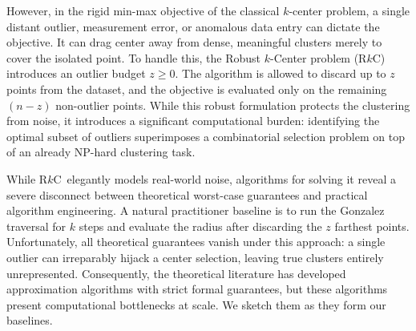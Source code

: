 \documentclass[twoside,leqno,twocolumn]{article}
\newcommand{\rkc}{R$k$C}
\begin{document}
However, in the rigid min-max objective of the classical $k$-center problem, a single distant outlier, measurement error, or anomalous data entry can dictate the objective. It can drag center away from dense, meaningful clusters merely to cover the isolated point. To handle this, the Robust $k$-Center problem (\rkc) introduces an outlier budget $z \ge 0$. The algorithm is allowed to discard up to $z$ points from the dataset, and the objective is evaluated only on the remaining $(n - z)$ non-outlier points. While this robust formulation protects the clustering from noise, it introduces a significant computational burden: identifying the optimal subset of outliers superimposes a combinatorial selection problem on top of an already NP-hard clustering task.

While \rkc~elegantly models real-world noise, algorithms for solving it reveal a severe disconnect between theoretical worst-case guarantees and practical algorithm engineering. A natural practitioner baseline is to run the Gonzalez traversal for $k$ steps and evaluate the radius after discarding the $z$ farthest points. Unfortunately, all theoretical guarantees vanish under this approach: a single outlier can irreparably hijack a center selection, leaving true clusters entirely unrepresented. Consequently, the theoretical literature has developed approximation algorithms with strict formal guarantees, but these algorithms present computational bottlenecks at scale. We sketch them as they form our baselines.
\end{document}
